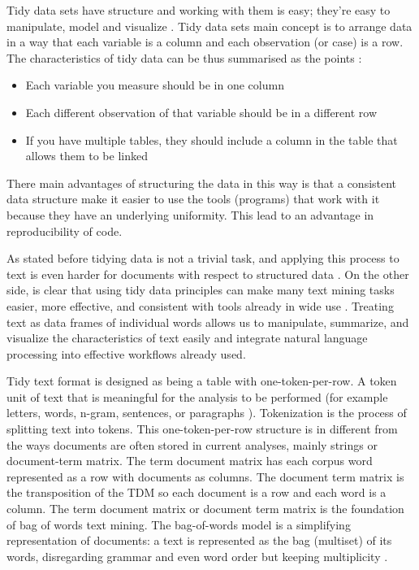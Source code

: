 \documentclass[]{book}
\providecommand{\tightlist}{%
  \setlength{\itemsep}{0pt}\setlength{\parskip}{0pt}}
\begin{document}
Tidy data sets have structure and working with them is easy; they're
easy to manipulate, model and visualize \citep{wickham2014tidy}. Tidy
data sets main concept is to arrange data in a way that each variable is
a column and each observation (or case) is a row. The characteristics of
tidy data can be thus summarised as the points \citep{leek2015elements}:

\begin{itemize}
\tightlist
\item
  Each variable you measure should be in one column
\item
  Each different observation of that variable should be in a different
  row
\item
  If you have multiple tables, they should include a column in the table
  that allows them to be linked
\end{itemize}

There main advantages of structuring the data in this way is that a
consistent data structure make it easier to use the tools (programs)
that work with it because they have an underlying uniformity. This lead
to an advantage in reproducibility of code.

As stated before tidying data is not a trivial task, and applying this
process to text is even harder for documents with respect to structured
data \citep{silge2016tidytext}. On the other side, is clear that using
tidy data principles can make many text mining tasks easier, more
effective, and consistent with tools already in wide use . Treating text
as data frames of individual words allows us to manipulate, summarize,
and visualize the characteristics of text easily and integrate natural
language processing into effective workflows already used.

Tidy text format is designed as being a table with one-token-per-row. A
token unit of text that is meaningful for the analysis to be performed
(for example letters, words, n-gram, sentences, or paragraphs ).
Tokenization is the process of splitting text into tokens. This
one-token-per-row structure is in different from the ways documents are
often stored in current analyses, mainly strings or document-term
matrix. The term document matrix has each corpus word represented as a
row with documents as columns. The document term matrix is the
transposition of the TDM so each document is a row and each word is a
column. The term document matrix or document term matrix is the
foundation of bag of words text mining. The bag-of-words model is a
simplifying representation of documents: a text is represented as the
bag (multiset) of its words, disregarding grammar and even word order
but keeping multiplicity \citep{mctear2016conversational}.
\end{document}
